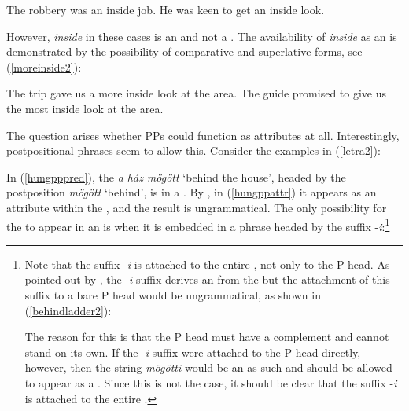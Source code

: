 \ea \label{insideattr2}
\ea	The robbery was an inside job.
\ex	He was keen to get an inside look.
\z
\z

However, \textit{inside} in these cases is an  and not a . The availability of \textit{inside} as an  is demonstrated by the possibility of comparative and superlative forms, see (\ref{moreinside2}):

\ea \label{moreinside2}
\ea	The trip gave us a more inside look at the area.
\ex	The guide promised to give us the most inside look at the area.
\z
\z

The question arises whether PPs could function as attributes at all. Interestingly,  postpositional phrases seem to allow this. Consider the examples in (\ref{letra2}):

\ea \label{letra2}
\z
\z

In (\ref{hungpppred}), the  \textit{a ház mögött} `behind the house', headed by the postposition \textit{mögött} `behind', is in a . By , in (\ref{hungppattr}) it appears as an attribute within the , and the result is ungrammatical. The only possibility for the  to appear in an  is when it is embedded in a phrase headed by the suffix -\textit{i}:\footnote{Note that the suffix -\textit{i} is attached to the entire , not only to the P head. As pointed out by \citet[163]{kenesei1995}, the -\textit{i} suffix derives an  from the  but the attachment of this suffix to a bare P head would be ungrammatical, as shown in (\ref{behindladder2}):

\z

The reason for this is that the P head must have a complement and cannot stand on its own. If the -\textit{i} suffix were attached to the P head directly, however, then the string \textit{mögötti} would be an  as such and should be allowed to appear as a . Since this is not the case, it should be clear that the suffix -\textit{i} is attached to the entire .}


